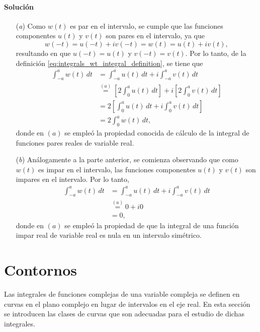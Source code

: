 \documentclass[a4paper]{report}
\begin{document}
\paragraph{Solución}  
\begin{enumerate}
 \item[(\textit{a})] Como \(w(t)\) es par en el intervalo, se cumple que las funciones componentes \(u(t)\) y \(v(t)\) son pares en el intervalo, ya que 
 \[
  w(-t)=u(-t)+iv(-t)=w(t)=u(t)+iv(t),
 \]
 resultando en que \(u(-t)=u(t)\) y \(v(-t)=v(t)\). Por lo tanto, de la definición \ref{eq:integrals_wt_integral_definition}, se tiene que 
 \begin{align*}
  \int_{-a}^aw(t)\,dt&=\int_{-a}^au(t)\,dt+i\int_{-a}^av(t)\,dt\\
  &\overset{(a)}{=}\left[2\int_0^au(t)\,dt\right]+i\left[2\int_0^av(t)\,dt\right]\\
  &=2\left[\int_0^au(t)\,dt+i\int_0^av(t)\,dt\right]\\
  &=2\int_0^aw(t)\,dt,
 \end{align*}
 donde en \((a)\) se empleó la propiedad conocida de cálculo de la integral de funciones pares reales de variable real.
 \item[(\textit{b})] Análogamente a la parte anterior, se comienza observando que como \(w(t)\) es impar en el intervalo, las funciones componentes \(u(t)\) y \(v(t)\) son impares en el intervalo. Por lo tanto,
 \begin{align*}
  \int_{-a}^aw(t)\,dt&=\int_{-a}^au(t)\,dt+i\int_{-a}^av(t)\,dt\\
  &\overset{(a)}{=}0+i0\\
  &=0,
 \end{align*}
 donde en \((a)\) se empleó la propiedad de que la integral de una función impar real de variable real es nula en un intervalo simétrico.
\end{enumerate} 

\section{Contornos}\label{sec:contours}

Las integrales de funciones complejas de una variable compleja se definen en curvas en el plano complejo en lugar de intervalos en el eje real. En esta sección se introducen las clases de curvas que son adecuadas para el estudio de dichas integrales.
\end{document}
